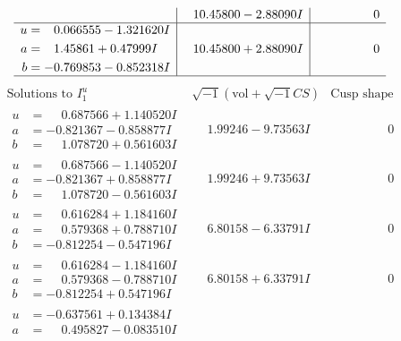 \documentclass[1p]{elsarticle_modified}
\theoremstyle{definition}
\newcommand{\I}{\sqrt{-1}}
\begin{document}
$$\begin{array}{c|c|c}
 & \phantom{-}10.45800 - 2.88090 I & \phantom{-0.000000 } 0 \\ \hline\begin{aligned}
u &= \phantom{-}0.066555 - 1.321620 I \\
a &= \phantom{-}1.45861 + 0.47999 I \\
b &= -0.769853 - 0.852318 I\end{aligned}
 & \phantom{-}10.45800 + 2.88090 I & \phantom{-0.000000 } 0\\
 \hline 
 \end{array}$$\newpage$$\begin{array}{c|c|c}  
\text{Solutions to }I^u_{1}& \I (\text{vol} + \sqrt{-1}CS) & \text{Cusp shape}\\
 \hline 
\begin{aligned}
u &= \phantom{-}0.687566 + 1.140520 I \\
a &= -0.821367 - 0.858877 I \\
b &= \phantom{-}1.078720 + 0.561603 I\end{aligned}
 & \phantom{-}1.99246 - 9.73563 I & \phantom{-0.000000 } 0 \\ \hline\begin{aligned}
u &= \phantom{-}0.687566 - 1.140520 I \\
a &= -0.821367 + 0.858877 I \\
b &= \phantom{-}1.078720 - 0.561603 I\end{aligned}
 & \phantom{-}1.99246 + 9.73563 I & \phantom{-0.000000 } 0 \\ \hline\begin{aligned}
u &= \phantom{-}0.616284 + 1.184160 I \\
a &= \phantom{-}0.579368 + 0.788710 I \\
b &= -0.812254 - 0.547196 I\end{aligned}
 & \phantom{-}6.80158 - 6.33791 I & \phantom{-0.000000 } 0 \\ \hline\begin{aligned}
u &= \phantom{-}0.616284 - 1.184160 I \\
a &= \phantom{-}0.579368 - 0.788710 I \\
b &= -0.812254 + 0.547196 I\end{aligned}
 & \phantom{-}6.80158 + 6.33791 I & \phantom{-0.000000 } 0 \\ \hline\begin{aligned}
u &= -0.637561 + 0.134384 I \\
a &= \phantom{-}0.495827 - 0.083510 I \\

\end{aligned}
\end{array}$$
\end{document}
